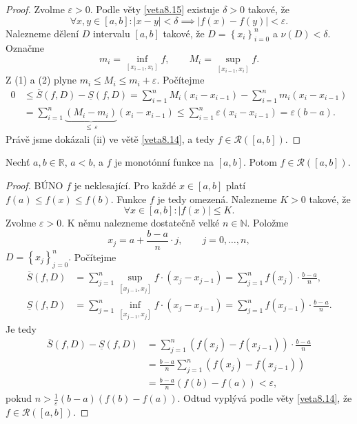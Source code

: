 \begin{proof}
	Zvolme $\varepsilon > 0$. Podle věty \ref{veta8.15} existuje $\delta > 0$ takové, že
	$$
	    \forall x ,y \in [a,b]: |x-y| < \delta \implies |f(x)-f(y)| < \varepsilon.
	$$
	Nalezneme dělení $D$ intervalu $[a,b]$ takové, že
	$D = \left \{ x_i \right \}_{i=0}^n $ a $\nu (D)<\delta$. Označme
	$$
	m_i = \inf_{[x_{i-1},x_i]}  f, \qquad M_i = \sup_{[x_{i-1},x_i]} f.
	$$
	Z (1) a (2) plyne $m_i \leq M_i \leq m_i+\varepsilon$. Počítejme
	\begin{align*}
	0 &\leq \overline S(f,D) - \underline S(f,D) = \sum_{i=1}^n M_i(x_i-x_{i-1}) - \sum_{i=1}^n m_i(x_i - x_{i-1}) \\
	&= \sum_{i=1}^n \underbrace{(M_i-m_i)}_{\leq\, \varepsilon}(x_i-x_{i-1}) \leq \sum_{i=1}^n \varepsilon (x_i-x_{i-1}) = \varepsilon (b-a).
	\end{align*}
	Právě jsme dokázali (ii) ve větě \ref{veta8.14}, a tedy $f\in \mathcal R([a,b])$.
\end{proof}

\begin{veta}\label{veta8.17}
Nechť $a,b \in \mathbb{R}$, $a<b$, a $f$ je monotónní funkce na $[a,b]$. Potom $f \in \mathcal R([a,b])$.
\end{veta}

\begin{proof}
	BÚNO  $f$ je neklesající. Pro každé $x \in \left [ a,b \right ] $ platí $f(a)\leq f(x)\leq f(b)$.
	Funkce $f$ je tedy omezená. Nalezneme $K > 0$ takové, že
	$$
	    \forall x \in \left [ a,b \right ] : |f(x)|\leq K.
	$$
	Zvolme $\varepsilon >0$. K němu nalezneme dostatečně velké $n \in \mathbb N $. Položme
	$$
	    x_j = a+ \frac{b-a}{n}\cdot j, \qquad j=0,\dots,n,
	$$
	$ D = \left \{ x_j \right \}_{j=0}^n. $ Počítejme
	\begin{align*}
	\overline S(f,D) &= \sum_{j=1}^n \sup_{[x_{j-1},x_j]}f \cdot (x_j-x_{j-1}) = \sum _{j=1}^n f(x_j)\cdot \frac{b-a}{n},\\
	\underline S(f,D) &= \sum_{j=1}^n \inf_{[x_{j-1},x_j]}f \cdot (x_j-x_{j-1}) = \sum _{j=1}^n f(x_{j-1})\cdot \frac{b-a}{n}.
	\end{align*}
	Je tedy
	\begin{align*}
	\overline S(f,D) - \underline S(f,D) &= \sum_{j=1}^n \left( f(x_j)-f(x_{j-1}) \right )\cdot \frac{b-a}{n} \\
	&= \frac{b-a}{n} \sum_{j=1}^n \left( f(x_j)-f(x_{j-1}) \right ) \\
	&= \frac{b-a}{n} \left( f(b) -f(a)\right ) <\varepsilon,
\end{align*}
pokud $n > \frac{1}{\varepsilon}(b-a)(f(b)-f(a))$. Odtud vyplývá podle věty \ref{veta8.14}, že $f \in \mathcal R([a,b])$.
\end{proof}

